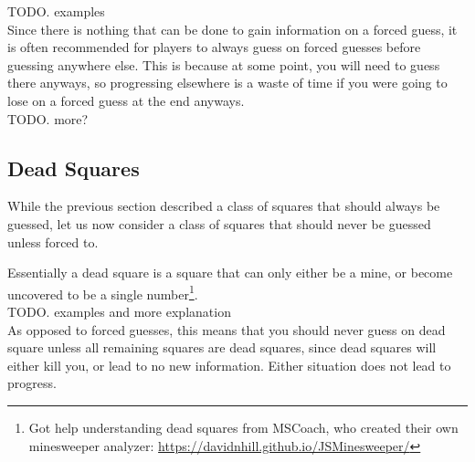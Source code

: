TODO. examples\\

Since there is nothing that can be done to gain information on a forced guess, it is often recommended for players to always guess on forced guesses before guessing anywhere else. This is because at some point, you will need to guess there anyways, so progressing elsewhere is a waste of time if you were going to lose on a forced guess at the end anyways.\\

TODO. more?\\

\subsection{Dead Squares}
While the previous section described a class of squares that should always be guessed, let us now consider a class of squares that should never be guessed unless forced to.


Essentially a dead square is a square that can only either be a mine, or become uncovered to be a single number\footnote{Got help understanding dead squares from MSCoach, who created their own minesweeper analyzer: \url{https://davidnhill.github.io/JSMinesweeper/}}.\\

TODO. examples and more explanation\\

As opposed to forced guesses, this means that you should never guess on dead square unless all remaining squares are dead squares, since dead squares will either kill you, or lead to no new information. Either situation does not lead to progress.\\